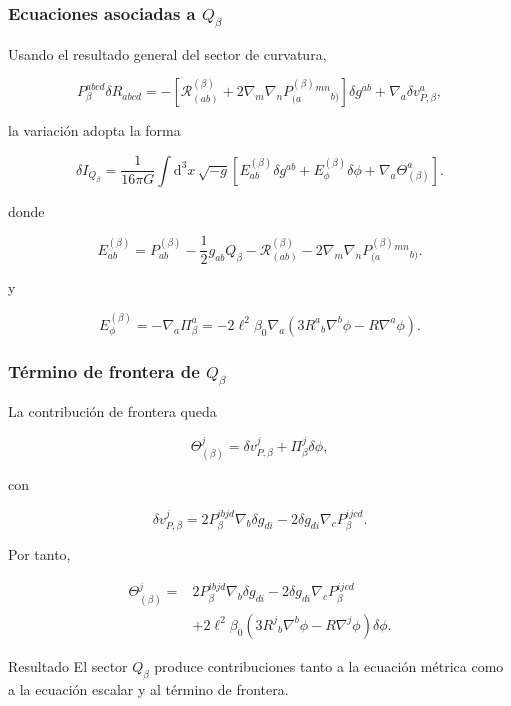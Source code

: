 \documentclass{beamer}
\newcommand{\Rcal}{\mathcal{R}}
\renewcommand{\dd}{\mathrm{d}}
\begin{document}
\begin{frame}[label=nav-frame-112]
\frametitle{Ecuaciones asociadas a \(Q_\beta\)}
\small

Usando el resultado general del sector de curvatura,

\[
P_\beta^{abcd}\delta R_{abcd}
=
-
\left[
\Rcal^{(\beta)}_{(ab)}
+
2\nabla_m\nabla_n
P^{(\beta)}_{(a}{}^{mn}{}_{b)}
\right]\delta g^{ab}
+
\nabla_a\delta v^a_{P,\beta},
\]


la variación adopta la forma

\[
\boxed{
\delta I_{Q_\beta}
=
\frac{1}{16\pi G}
\int\dd^3x\,\sqrt{-g}
\left[
E^{(\beta)}_{ab}\delta g^{ab}
+
E^{(\beta)}_\phi\delta\phi
+
\nabla_a\Theta^a_{(\beta)}
\right].
}
\]


donde

\begin{equation}
\boxed{
E^{(\beta)}_{ab}
=
P^{(\beta)}_{ab}
-\frac12g_{ab}Q_\beta
-\Rcal^{(\beta)}_{(ab)}
-2\nabla_m\nabla_n
P^{(\beta)}_{(a}{}^{mn}{}_{b)}.
}
\label{eq:Eab-beta}
\end{equation}

y

\begin{equation}
\boxed{
E^{(\beta)}_\phi
=
-\nabla_a\Pi_\beta^a
=
-2\ell^2\beta_0
\nabla_a
\left(
3R^a{}_b\nabla^b\phi
-
R\nabla^a\phi
\right).
}
\label{eq:Ephi-beta}
\end{equation}

\end{frame}

\begin{frame}[label=nav-frame-113]
\frametitle{Término de frontera de \(Q_\beta\)}
\small

La contribución de frontera queda

\[
\Theta^j_{(\beta)}
=
\delta v^j_{P,\beta}
+
\Pi_\beta^j\delta\phi,
\]

con

\[
\delta v^j_{P,\beta}
=
2P_\beta^{ibjd}\nabla_b\delta g_{di}
-
2\delta g_{di}\nabla_cP_\beta^{ijcd}.
\]

Por tanto,

\begin{equation}
\boxed{
\begin{aligned}
\Theta^j_{(\beta)}
={}&
2P_\beta^{ibjd}\nabla_b\delta g_{di}
-
2\delta g_{di}\nabla_cP_\beta^{ijcd}
\\
&+
2\ell^2\beta_0
\left(
3R^j{}_b\nabla^b\phi
-
R\nabla^j\phi
\right)\delta\phi.
\end{aligned}
}
\label{eq:frontera-Qbeta}
\end{equation}

\begin{block}{Resultado}
El sector \(Q_\beta\) produce contribuciones tanto a la
ecuación métrica como a la ecuación escalar y al término
de frontera.
\end{block}

\end{frame}
\end{document}

